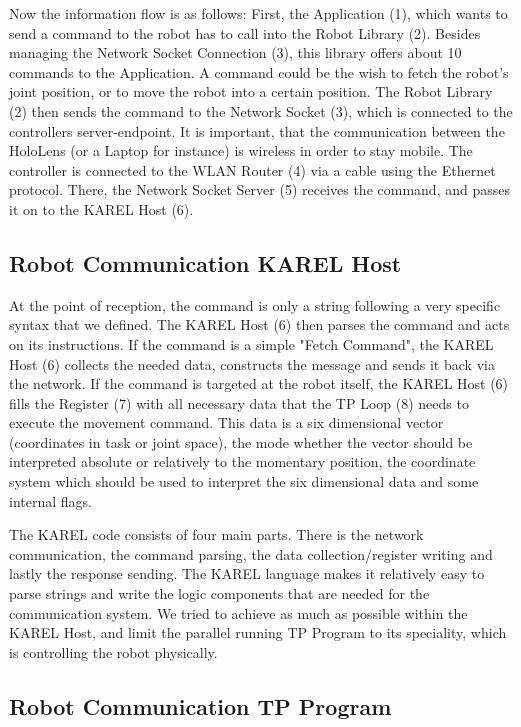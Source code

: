 Now the information flow is as follows: First, the Application (1), which wants to send a command to the robot has to call into the Robot Library (2). Besides managing the Network Socket Connection (3), this library offers about 10 commands to the Application. A command could be the wish to fetch the robot's joint position, or to move the robot into a certain position. The Robot Library (2) then sends the command to the Network Socket (3), which is connected to the controllers server-endpoint. It is important, that the communication between the HoloLens (or a Laptop for instance) is wireless in order to stay mobile. The controller is connected to the WLAN Router (4) via a cable using the Ethernet protocol. There, the Network Socket Server (5) receives the command, and passes it on to the KAREL Host (6). 

\subsection{Robot Communication KAREL Host}

At the point of reception, the command is only a string following a very specific syntax that we defined. The KAREL Host (6) then parses the command and acts on its instructions. If the command is a simple "Fetch Command", the KAREL Host (6) collects the needed data, constructs the message and sends it back via the network. If the command is targeted at the robot itself, the KAREL Host (6) fills the Register (7) with all necessary data that the TP Loop (8) needs to execute the movement command. This data is a six dimensional vector (coordinates in task or joint space), the mode whether the vector should be interpreted absolute or relatively to the momentary position, the coordinate system which should be used to interpret the six dimensional data and some internal flags.

The KAREL code consists of four main parts. There is the network communication, the command parsing, the data collection/register writing and lastly the response sending. The KAREL language makes it relatively easy to parse strings and write the logic components that are needed for the communication system. We tried to achieve as much as possible within the KAREL Host, and limit the parallel running TP Program to its speciality, which is controlling the robot physically.

\subsection{Robot Communication TP Program}

